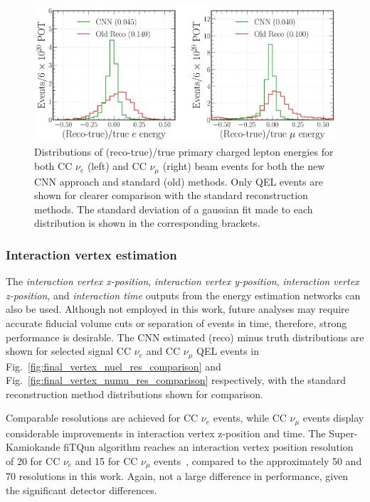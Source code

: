 \begin{figure} %
    \includegraphics[width=\textwidth]{diagrams/7-results/final_frac_e_comparison.pdf}
    \caption[Distributions of (reco-true)/true primary charged lepton energies for the CNN and
        standard methods] {Distributions of (reco-true)/true primary charged lepton energies for
        both CC $\nu_{e}$ (left) and CC $\nu_{\mu}$ (right) beam events for both the new CNN
        approach and standard (old) methods. Only QEL events are shown for clearer comparison with
        the standard reconstruction methods. The standard deviation of a gaussian fit made to each
        distribution is shown in the corresponding brackets.}
    \label{fig:final_frac_e_comparison}
\end{figure}

\subsubsection*{Interaction vertex estimation} %

The \emph{interaction vertex x-position}, \emph{interaction vertex y-position}, \emph{interaction
    vertex z-position}, and \emph{interaction time} outputs from the energy estimation networks
    can also be used. Although not employed in this work, future analyses may require accurate
    fiducial volume cuts or separation of events in time, therefore, strong performance is
    desirable. The CNN estimated (reco) minus truth distributions are shown for selected signal CC
    $\nu_{e}$ and CC $\nu_{\mu}$ QEL events in Fig.~\ref{fig:final_vertex_nuel_res_comparison} and
    Fig.~\ref{fig:final_vertex_numu_res_comparison} respectively, with the standard reconstruction
    method distributions shown for comparison.

Comparable resolutions are achieved for CC $\nu_{e}$ events, while CC $\nu_{\mu}$ events display
considerable improvements in interaction vertex z-position and time. The Super-Kamiokande fiTQun
algorithm reaches an interaction vertex position resolution of \unit{20}{} for CC
$\nu_{e}$ and \unit{15}{} for CC $\nu_{\mu}$ events~\cite{jiang2019}, compared to the
approximately \unit{50}{} and \unit{70}{} resolutions in this work. Again, not a
large difference in performance, given the significant detector differences.

